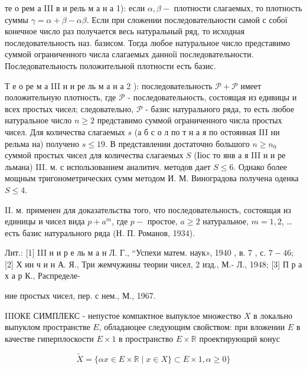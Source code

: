 \documentclass[10pt]{article}
\begin{document}
те о рем а III в и рель м а н а 1): если $\alpha, \beta-$ плотности слагаемых, то плотность суммы $\gamma=\alpha+\beta-\alpha \beta$. Если при сложении последовательности самой с собої конечное число раз получается весь натуральный ряд, то исходная последовательность наз. базисом. Тогда любое натуральное число представимо суммой ограниченного числа слагаемых данноїі последовательности. Последовательность положительной плотности есть базис.



Т е о ре м а III н и ре ль м а н а 2 ): последовательность $\mathscr{P}+\mathscr{P}$ имеет положительную плотность, где $\mathscr{P}$ - последовательность, состоящая из едивицы и всех простых чисел; следовательно, $\mathscr{P}$ - базис натурального ряда, то есть любое натуральное число $n \geqslant 2$ представимо суммой ограниченного числа простых чисел. Для количества слагаемых $s$ (а б с о л по т н а я по остоянная III ни рельма на) получено $s \leqslant 19$. В представлении достаточно большого $n \geqslant n_{0}$ суммой простых чисел для количества слагаемых $S$ (Ііос то янв а я III н и ре льмана) III. м. с использованием аналитич. методов дает $S \leqslant 6$. Однако более мощным тригонометрических сумм методом И. М. Виноградова получена оденка $S \leqslant 4$.



II. м. применен для доказательства того, что последовательность, состоящая из единицы и чисел вида $p+a^{m}$, где $p-$ простое, $a \geqslant 2$ натуральное, $m=1,2$, … есть базис натурального ряда (Н. П. Романов, 1934).



Лит.: [1] III н и р е ль м а н Л. Г., “Успехи матем. наук», 1940 , в. 7 , с. $7-46$; [2] Х ин ч и н А. Я., Три жемчужины теории чисел, 2 изд., М.- Л., 1948; [3] П р а х а р К., Распределе-

ние простых чисел, пер. с нем., М., 1967.



IIIОКЕ СИМПЛЕКС - непустое компактное выпуклое множество $X$ в локально выпуклом пространстве $E$, обладаюцее следующим свойством: при вложении $E$ в качестве гиперплоскости $E \times 1$ в пространство $E \times \mathbb{R}$ проектирующий конус



\[

\tilde{X}=\{\alpha x \in E \times \mathbb{R} \mid x \in X\} \subset E \times 1, \alpha \geqslant 0\}

\]
\end{document}
